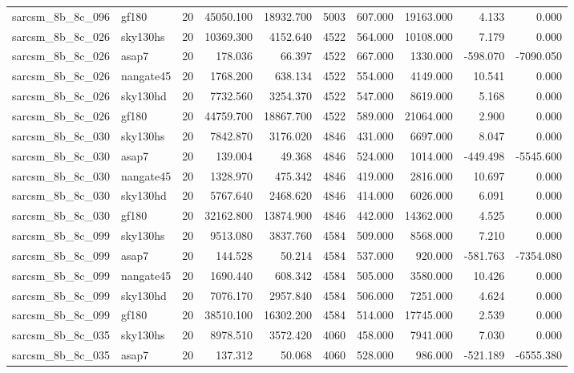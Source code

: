 \begin{longtable}{llrrrrrrrr}
sarcsm\_8b\_8c\_096 & gf180 & 20 & 45050.100 & 18932.700 & 5003 & 607.000 & 19163.000 & 4.133 & 0.000 \\
sarcsm\_8b\_8c\_026 & sky130hs & 20 & 10369.300 & 4152.640 & 4522 & 564.000 & 10108.000 & 7.179 & 0.000 \\
sarcsm\_8b\_8c\_026 & asap7 & 20 & 178.036 & 66.397 & 4522 & 667.000 & 1330.000 & -598.070 & -7090.050 \\
sarcsm\_8b\_8c\_026 & nangate45 & 20 & 1768.200 & 638.134 & 4522 & 554.000 & 4149.000 & 10.541 & 0.000 \\
sarcsm\_8b\_8c\_026 & sky130hd & 20 & 7732.560 & 3254.370 & 4522 & 547.000 & 8619.000 & 5.168 & 0.000 \\
sarcsm\_8b\_8c\_026 & gf180 & 20 & 44759.700 & 18867.700 & 4522 & 589.000 & 21064.000 & 2.900 & 0.000 \\
sarcsm\_8b\_8c\_030 & sky130hs & 20 & 7842.870 & 3176.020 & 4846 & 431.000 & 6697.000 & 8.047 & 0.000 \\
sarcsm\_8b\_8c\_030 & asap7 & 20 & 139.004 & 49.368 & 4846 & 524.000 & 1014.000 & -449.498 & -5545.600 \\
sarcsm\_8b\_8c\_030 & nangate45 & 20 & 1328.970 & 475.342 & 4846 & 419.000 & 2816.000 & 10.697 & 0.000 \\
sarcsm\_8b\_8c\_030 & sky130hd & 20 & 5767.640 & 2468.620 & 4846 & 414.000 & 6026.000 & 6.091 & 0.000 \\
sarcsm\_8b\_8c\_030 & gf180 & 20 & 32162.800 & 13874.900 & 4846 & 442.000 & 14362.000 & 4.525 & 0.000 \\
sarcsm\_8b\_8c\_099 & sky130hs & 20 & 9513.080 & 3837.760 & 4584 & 509.000 & 8568.000 & 7.210 & 0.000 \\
sarcsm\_8b\_8c\_099 & asap7 & 20 & 144.528 & 50.214 & 4584 & 537.000 & 920.000 & -581.763 & -7354.080 \\
sarcsm\_8b\_8c\_099 & nangate45 & 20 & 1690.440 & 608.342 & 4584 & 505.000 & 3580.000 & 10.426 & 0.000 \\
sarcsm\_8b\_8c\_099 & sky130hd & 20 & 7076.170 & 2957.840 & 4584 & 506.000 & 7251.000 & 4.624 & 0.000 \\
sarcsm\_8b\_8c\_099 & gf180 & 20 & 38510.100 & 16302.200 & 4584 & 514.000 & 17745.000 & 2.539 & 0.000 \\
sarcsm\_8b\_8c\_035 & sky130hs & 20 & 8978.510 & 3572.420 & 4060 & 458.000 & 7941.000 & 7.030 & 0.000 \\
sarcsm\_8b\_8c\_035 & asap7 & 20 & 137.312 & 50.068 & 4060 & 528.000 & 986.000 & -521.189 & -6555.380 \\

\end{longtable}
